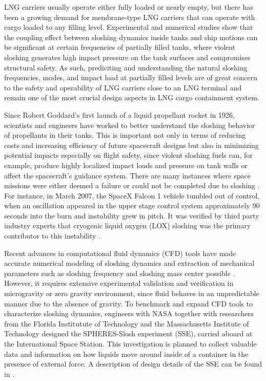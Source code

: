 \documentclass[letterpaper, 12pt]{amsart}
\begin{document}
LNG carriers usually operate either fully loaded or nearly empty, but there has been a growing demand for membrane-type LNG carriers that can operate with cargo loaded to any filling level. Experimental and numerical studies show that the coupling effect between sloshing dynamics inside tanks and ship motions can be significant at certain frequencies of partially filled tanks, where violent sloshing generates high impact pressure on the tank surfaces and compromises structural safety. As such, prediciting and understanding the natural sloshing frequencies, modes, and impact load at partially filled levels are of great concern to the safety and operability of LNG carriers close to an LNG terminal and remain one of the most crucial design aspects in LNG cargo containment system. 

Since Robert Goddard's first launch of a liquid propellant rocket in 1926, scientists and engineers have worked to better understand the sloshing behavior of propellants in their tanks. This is important not only in terms of reducing costs and increasing efficiency of future spacecraft designs but also in minimizing potential impacts especially on flight safety, since violent sloshing fuels can, for example, produce highly localized impact loads and pressure on tank walls or affect the spacecraft's guidance system. There are many instances  where space missions were either deemed a failure or could not be completed due to sloshing \cite{Kyle:1957aa, Hydro:1965aa, Jones:1995aa, Strikwerda:2001aa, Schlee:2007aa}. For instance, in March 2007, the SpaceX Falcon 1 vehicle tumbled out of control, when an oscillation appeared in the upper stage control system approximately 90 seconds into the burn and instability grew in pitch. It was verified by third party industry experts that cryogenic liquid oxygen (LOX) sloshing was the primary contributor to this instability \cite{Falcon1:2007aa}.

Recent advances in computational fluid dynamics (CFD) tools have made accurate numerical modeling of sloshing dynamics and extraction of mechanical parameters such as sloshing frequency and sloshing mass center possible \cite{Peugeot:2010aa}. However, it requires extensive experimental validation and verification in microgravity or zero gravity environment, since fluid behaves in an unpredictable manner due to the absence of gravity. To benchmark and expand CFD tools to characterize sloshing dynamics, engineers with NASA together with researchers from the Florida Institutute of Technology and the Massachusetts Institute of Technology designed the SPHERES-Slosh experiment (SSE), carried aboard at the International Space Station. This investigation is planned to collect valuable data and information on how liquids move around inside of a container in the presence of external force. A description of design details of the SSE can be found in \cite{Chintalapati:2013aa, Lapilli:2015aa}. 
\end{document}
